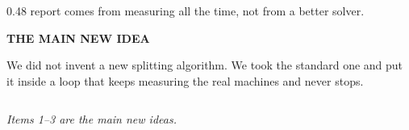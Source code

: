 \documentclass[aspectratio=169,11pt]{beamer}
\newcommand{\kefoot}[1]{%
  \vfill{\scriptsize\itshape\color{kemuted}#1}%
}
\begin{document}
\begin{frame}[shrink=20]
\begin{columns}[T]
\begin{column}{0.48\textwidth}
{{      report comes from measuring all the time, not from a better solver.}}\vspace{0.35em}
    \colorbox{keink}{\begin{minipage}{\dimexpr\textwidth-14pt\relax}
      \vspace{0.3em}
      {\scriptsize\bfseries\color{keamber}THE MAIN NEW IDEA}\par\vspace{0.4em}
      {\footnotesize\color{white!80!keink}We did not invent a new splitting
       algorithm. We took the standard one and put it inside a loop that keeps
       measuring the real machines and never stops.}
      \vspace{0.3em}
    \end{minipage}}
  \end{column}
  \end{columns}
  \kefoot{Items 1--3 are the main new ideas.}
\end{frame}
\end{document}
